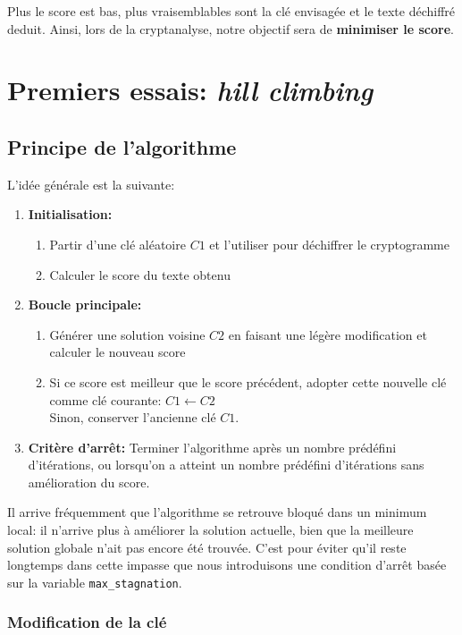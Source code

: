 \documentclass[a4paper]{article}
\begin{document}
Plus le score est bas, plus vraisemblables sont la clé envisagée et le texte déchiffré deduit. Ainsi, lors de la cryptanalyse, notre objectif sera de \textbf{minimiser le score}.


\section{Premiers essais: \textit{hill climbing}}

\subsection{Principe de l’algorithme}

L’idée générale est la suivante:
\begin{enumerate}
    \item \textbf{Initialisation:}
    \begin{enumerate}
        \item Partir d'une clé aléatoire $C1$ et l'utiliser pour déchiffrer le cryptogramme
        \item Calculer le score du texte obtenu
    \end{enumerate}
    \item \textbf{Boucle principale:}
    \begin{enumerate}[label= (\alph*)]
        \item\label{item:modification} Générer une solution voisine $C2$ en faisant une légère modification et calculer le nouveau score
        \item Si ce score est meilleur que le score précédent, adopter cette nouvelle clé comme clé courante: $C1 \leftarrow C2$\\
              Sinon, conserver l’ancienne clé $C1$.
    \end{enumerate}
    \item \textbf{Critère d'arrêt:} Terminer l'algorithme après un nombre prédéfini d'itérations, ou lorsqu'on a atteint un nombre prédéfini d'itérations sans amélioration du score.
\end{enumerate}

Il arrive fréquemment que l’algorithme se retrouve bloqué dans un minimum local: il n’arrive plus à améliorer la solution actuelle, bien que la meilleure solution globale n’ait pas encore été trouvée.  
C'est pour éviter qu'il reste longtemps dans cette impasse que nous introduisons une condition d'arrêt basée sur la variable \texttt{max\_stagnation}.

\subsubsection*{Modification de la clé}\label{modification_cle}
\end{document}
